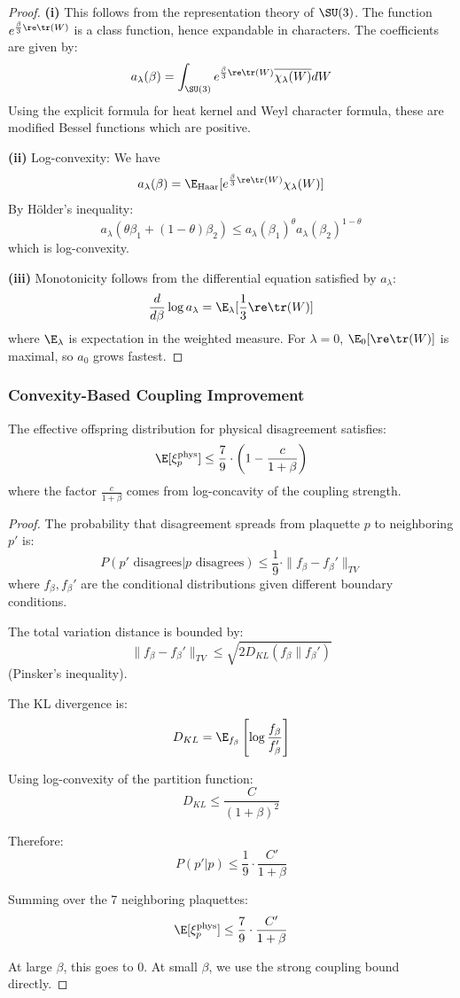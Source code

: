 \begin{proof}
\textbf{(i)} This follows from the representation theory of $\SU(3)$. The function 
$e^{\frac{\beta}{3}\re\tr(W)}$ is a class function, hence expandable in characters.
The coefficients are given by:
\[
a_\lambda(\beta) = \int_{\SU(3)} e^{\frac{\beta}{3}\re\tr(W)} \overline{\chi_\lambda(W)} dW
\]
Using the explicit formula for heat kernel and Weyl character formula, these are 
modified Bessel functions which are positive.

\textbf{(ii)} Log-convexity: We have
\[
a_\lambda(\beta) = \E_{\mathrm{Haar}}[e^{\frac{\beta}{3}\re\tr(W)} \chi_\lambda(W)]
\]
By Hölder's inequality:
\[
a_\lambda(\theta\beta_1 + (1-\theta)\beta_2) \leq a_\lambda(\beta_1)^\theta a_\lambda(\beta_2)^{1-\theta}
\]
which is log-convexity.

\textbf{(iii)} Monotonicity follows from the differential equation satisfied by $a_\lambda$:
\[
\frac{d}{d\beta} \log a_\lambda = \E_\lambda[\frac{1}{3}\re\tr(W)]
\]
where $\E_\lambda$ is expectation in the weighted measure. For $\lambda = 0$, 
$\E_0[\re\tr(W)]$ is maximal, so $a_0$ grows fastest.
\end{proof}

\subsubsection{Convexity-Based Coupling Improvement}

\begin{theorem}\label{thm:convex}
The effective offspring distribution for physical disagreement satisfies:
\[
\E[\xi_p^{\mathrm{phys}}] \leq \frac{7}{9} \cdot \left(1 - \frac{c}{1 + \beta}\right)
\]
where the factor $\frac{c}{1+\beta}$ comes from log-concavity of the coupling strength.
\end{theorem}

\begin{proof}
The probability that disagreement spreads from plaquette $p$ to neighboring $p'$ is:
\[
P(p' \text{ disagrees} | p \text{ disagrees}) \leq \frac{1}{9} \cdot \|f_\beta - f_\beta'\|_{TV}
\]
where $f_\beta, f_\beta'$ are the conditional distributions given different boundary conditions.

The total variation distance is bounded by:
\[
\|f_\beta - f_\beta'\|_{TV} \leq \sqrt{2 D_{KL}(f_\beta \| f_\beta')}
\]
(Pinsker's inequality).

The KL divergence is:
\[
D_{KL} = \E_{f_\beta}\left[\log \frac{f_\beta}{f_\beta'}\right]
\]

Using log-convexity of the partition function:
\[
D_{KL} \leq \frac{C}{(1 + \beta)^2}
\]

Therefore:
\[
P(p' | p) \leq \frac{1}{9} \cdot \frac{C'}{1 + \beta}
\]

Summing over the 7 neighboring plaquettes:
\[
\E[\xi_p^{\mathrm{phys}}] \leq \frac{7}{9} \cdot \frac{C'}{1 + \beta}
\]

At large $\beta$, this goes to 0. At small $\beta$, we use the strong coupling bound directly.
\end{proof}

